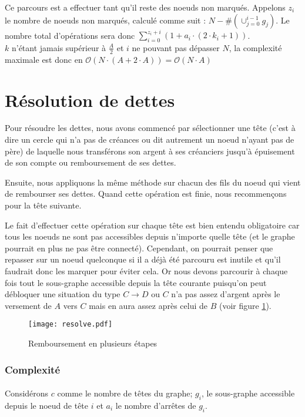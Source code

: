 \documentclass[12pt, oneside]{article}
\begin{document}
Ce parcours est a effectuer tant qu'il reste des noeuds non marqués. Appelons $z_{i}$ le nombre de noeuds non marqués, calculé comme suit : $N-\#(\cup_{j=0}^{i-1} g_{j})$.
Le nombre total d'opérations sera donc $\sum_{i=0}^{z_{i}+i}(1 + a_{i} \cdot(2\cdot k_{i} +1))$.\\

$k$ n'étant jamais supérieur à $\frac{A}{2}$ et $i$ ne pouvant pas dépasser $N$, la complexité maximale est donc en $\mathcal{O}(N\cdot (A + 2\cdot A)) = \mathcal{O}(N\cdot A)$


\section{Résolution de dettes}
Pour résoudre les dettes, nous avons commencé par sélectionner une tête (c'est à dire un cercle qui n'a pas de créances ou dit autrement un noeud n'ayant pas de père) de laquelle nous transférons son argent à ses créanciers jusqu'à épuisement de son compte ou remboursement de ses dettes.

Ensuite, nous appliquons la même méthode sur chacun des fils du noeud qui vient de rembourser ses dettes.
Quand cette opération est finie, nous recommençons pour la tête suivante.

Le fait d'effectuer cette opération sur chaque tête est bien entendu obligatoire car tous les noeuds ne sont pas accessibles depuis n'importe quelle tête (et le graphe pourrait en plus ne pas être connecté). Cependant, on pourrait penser que repasser sur un noeud quelconque si il a déjà été parcouru est inutile et qu'il faudrait donc les marquer pour éviter cela. Or nous devons parcourir à chaque fois tout le sous-graphe accessible depuis la tête courante puisqu'on peut débloquer une situation du type $C \rightarrow D$ ou $C$ n'a pas assez d'argent après le versement de $A$ vers $C$ mais en aura assez après celui de $B$ (voir figure \ref{resolve}).

\begin{figure}[h]
   \caption{\label{resolve} Remboursement en plusieurs étapes}
   \center
   \texttt{[image: resolve.pdf]}
\end{figure}


\subsubsection{Complexité}
\paragraph{}
Considérons $c$ comme le nombre de têtes du graphe; $g_{i}$, le sous-graphe accessible depuis le noeud de tête $i$ et $a_{i}$ le nombre d'arrêtes de $g_{i}$.
\end{document}
